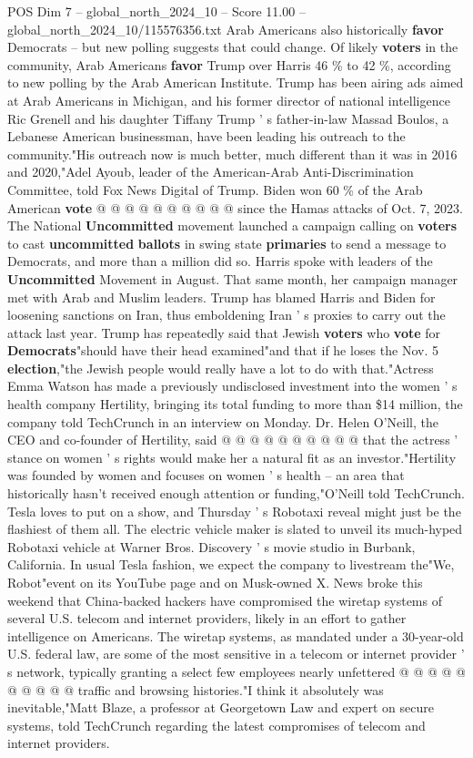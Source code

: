 \begin{textsample}{POS Dim 7 – global\_north\_2024\_10 – Score 11.00 – global\_north\_2024\_10/115576356.txt}
Arab Americans also historically \textbf{favor} Democrats -- but new polling suggests that could change.
Of likely \textbf{voters} in the community, Arab Americans \textbf{favor} Trump over Harris 46 \% to 42 \%, according to new polling by the Arab American Institute.
Trump has been airing ads aimed at Arab Americans in Michigan, and his former director of national intelligence Ric Grenell and his daughter Tiffany Trump ' s father-in-law Massad Boulos, a Lebanese American businessman, have been leading his outreach to the community."His outreach now is much better, much different than it was in 2016 and 2020,"Adel Ayoub, leader of the American-Arab Anti-Discrimination Committee, told Fox News Digital of Trump.
Biden won 60 \% of the Arab American \textbf{vote} @ @ @ @ @ @ @ @ @ @ since the Hamas attacks of Oct. 7, 2023.
The National \textbf{Uncommitted} movement launched a campaign calling on \textbf{voters} to cast \textbf{uncommitted} \textbf{ballots} in swing state \textbf{primaries} to send a message to Democrats, and more than a million did so.
Harris spoke with leaders of the \textbf{Uncommitted} Movement in August.
That same month, her campaign manager met with Arab and Muslim leaders.
Trump has blamed Harris and Biden for loosening sanctions on Iran, thus emboldening Iran ' s proxies to carry out the attack last year.
Trump has repeatedly said that Jewish \textbf{voters} who \textbf{vote} for \textbf{Democrats}"should have their head examined"and that if he loses the Nov. 5 \textbf{election},"the Jewish people would really have a lot to do with that."Actress Emma Watson has made a previously undisclosed investment into the women ' s health company Hertility, bringing its total funding to more than \$14 million, the company told TechCrunch in an interview on Monday.
Dr.
Helen O'Neill, the CEO and co-founder of Hertility, said @ @ @ @ @ @ @ @ @ @ that the actress ' stance on women ' s rights would make her a natural fit as an investor."Hertility was founded by women and focuses on women ' s health -- an area that historically hasn't received enough attention or funding,"O'Neill told TechCrunch.
Tesla loves to put on a show, and Thursday ' s Robotaxi reveal might just be the flashiest of them all.
The electric vehicle maker is slated to unveil its much-hyped Robotaxi vehicle at Warner Bros.
Discovery ' s movie studio in Burbank, California.
In usual Tesla fashion, we expect the company to livestream the"We, Robot"event on its YouTube page and on Musk-owned X.
News broke this weekend that China-backed hackers have compromised the wiretap systems of several U.S. telecom and internet providers, likely in an effort to gather intelligence on Americans.
The wiretap systems, as mandated under a 30-year-old U.S. federal law, are some of the most sensitive in a telecom or internet provider ' s network, typically granting a select few employees nearly unfettered @ @ @ @ @ @ @ @ @ @ traffic and browsing histories."I think it absolutely was inevitable,"Matt Blaze, a professor at Georgetown Law and expert on secure systems, told TechCrunch regarding the latest compromises of telecom and internet providers.


\end{textsample}
